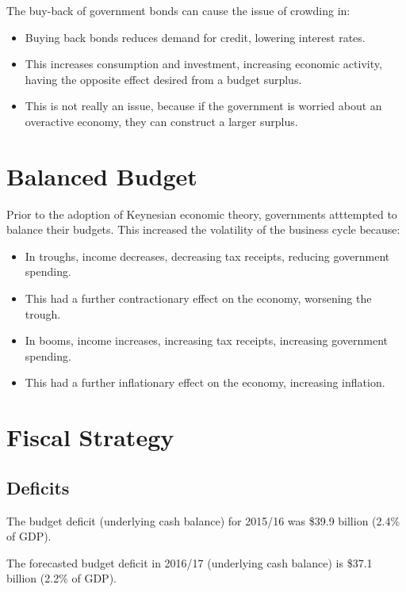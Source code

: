 \documentclass[a4paper,11pt]{article}
\begin{document}
The buy-back of government bonds can cause the issue of crowding in:

\begin{itemize}
\item Buying back bonds reduces demand for credit, lowering interest rates.
\item This increases consumption and investment, increasing economic activity,
	having the opposite effect desired from a budget surplus.
\item This is not really an issue, because if the government is worried about
	an overactive economy, they can construct a larger surplus.
\end{itemize}



\section{Balanced Budget}

Prior to the adoption of Keynesian economic theory, governments atttempted to
balance their budgets.
This increased the volatility of the business cycle because:

\begin{itemize}
\item In troughs, income decreases, decreasing tax receipts, reducing government
	spending.
\item This had a further contractionary effect on the economy, worsening the
	trough.
\item In booms, income increases, increasing tax receipts, increasing government
	spending.
\item This had a further inflationary effect on the economy, increasing
	inflation.
\end{itemize}



\section{Fiscal Strategy}

\subsection{Deficits}

The budget deficit (underlying cash balance) for 2015/16 was \$39.9 billion
(2.4\% of GDP).

The forecasted budget deficit in 2016/17 (underlying cash balance) is \$37.1
billion (2.2\% of GDP).
\end{document}
